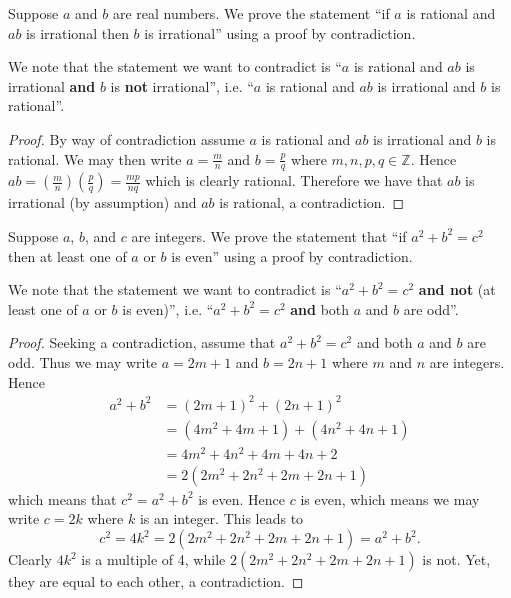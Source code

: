 \begin{example}
    Suppose $a$ and $b$ are real numbers. We prove the statement ``if $a$ is rational and $ab$ is irrational then $b$ is irrational'' using a proof by contradiction.
    
    We note that the statement we want to contradict is ``$a$ is rational and $ab$ is irrational \textbf{and} $b$ is \textbf{not} irrational'', i.e. ``$a$ is rational and $ab$ is irrational and $b$ is rational''.
    \begin{proof}
        By way of contradiction assume $a$ is rational and $ab$ is irrational and $b$ is rational. We may then write $a = \frac mn$ and $b = \frac pq$ where $m, n, p, q \in \mathbb{Z}$. Hence $ab = \left(\frac mn\right)\left(\frac pq\right) = \frac{mp}{nq}$ which is clearly rational. Therefore we have that $ab$ is irrational (by assumption) and $ab$ is rational, a contradiction.
    \end{proof}
\end{example}

\begin{example}
    Suppose $a$, $b$, and $c$ are integers. We prove the statement that ``if $a^2 + b^2 = c^2$ then at least one of $a$ or $b$ is even'' using a proof by contradiction.
    
    We note that the statement we want to contradict is ``$a^2 + b^2 = c^2$ \textbf{and not} (at least one of $a$ or $b$ is even)'', i.e. ``$a^2 + b^2 = c^2$ \textbf{and} both $a$ and $b$ are odd''.
    \begin{proof}
        Seeking a contradiction, assume that $a^2 + b^2 = c^2$ and both $a$ and $b$ are odd. Thus we may write $a = 2m + 1$ and $b = 2n + 1$ where $m$ and $n$ are integers. Hence
        \begin{align*}
            a^2 + b^2 &= (2m+1)^2 + (2n+1)^2\\
            &= (4m^2+4m+1) + (4n^2+4n+1)\\
            &= 4m^2 + 4n^2 + 4m + 4n + 2\\
            &= 2(2m^2 + 2n^2 + 2m + 2n +1)
        \end{align*}
        which means that $c^2 = a^2 + b^2$ is even. Hence $c$ is even, which means we may write $c = 2k$ where $k$ is an integer. This leads to
        \[
            c^2 = 4k^2 = 2(2m^2 + 2n^2 + 2m + 2n + 1) = a^2 + b^2.
        \]
        Clearly $4k^2$ is a multiple of 4, while $2(2m^2 + 2n^2 + 2m + 2n + 1)$ is not. Yet, they are equal to each other, a contradiction.
    \end{proof}
\end{example}

